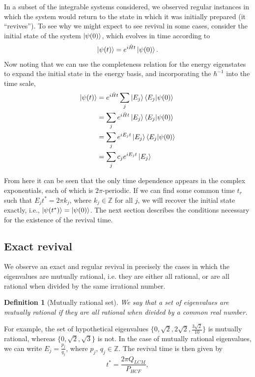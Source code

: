 \documentclass[a4paper, 10pt]{article}
\theoremstyle{plain}
\newtheorem{definition}[]{Definition}
\begin{document}
In a subset of the integrable systems considered, we observed regular instances
in which the system would return to the state in which it was initially
prepared (it ``revives''). To see why we might expect to see revival in
some cases, consider the initial state of the system $\ket{\psi(0)}$, which
evolves in time according to
\begin{equation}
 \ket{\psi(t)}=e^{i\hat{H}t}\ket{\psi(0)}.
\end{equation}
Now noting that we can use the completeness relation for the energy eigenstates
to expand the initial state in the energy basis, and incorporating the
$\hbar^{-1}$ into the time scale,
\begin{align}
\label{time_evolution}
 \ket{\psi(t)} &= e^{i\hat{H}t}\sum_j\ket{E_j}\braket{E_j|\psi(0)}  \nonumber \\
               &= \sum_je^{i\hat{H}t}\ket{E_j}\braket{E_j|\psi(0)}  \nonumber \\
               &= \sum_je^{iE_{j}t}\ket{E_j}\braket{E_j|\psi(0)}    \nonumber \\
               &= \sum_j c_{j}e^{iE_{j}t}\ket{E_j}
\end{align}

From here it can be seen that the only time dependence appears in the complex
exponentials, each of which is $2\pi$-periodic. If we can find some common
time $t_r$ such that $E_{j} t^*=2 \pi k_{j}$, where $k_{j} \in \mathbb{Z} $
for all $j$, we will recover the initial state exactly, i.e.,
$\ket{\psi(t^*)}=\ket{\psi(0)}$. The next section describes the conditions
necessary for the existence of the revival time.\\


\subsection{Exact revival}

We observe an exact and regular revival in precisely the cases in which the
eigenvalues are mutually rational, i.e. they are either all rational, or are all
rational when divided by the same irrational number.
\begin{definition}[Mutually rational set]
    We say that a set of eigenvalues are mutually rational if they are all
    rational when divided by a common real number.
\end{definition}

For example, the set of
hypothetical eigenvalues $\lbrace 0, \sqrt{2}, 2 \sqrt{2}, \frac{3 \sqrt{2}}{10}
\rbrace$ is mutually rational, whereas $\lbrace 0, \sqrt{2}, \sqrt{3}\rbrace$ is
not. In the case of mutually rational eigenvalues, we can write $E_{j} =
\frac{p_{j}}{q_{j}}$, where $p_{j}$, $q_{j} \in \mathbb{Z}$. The revival time is
then given by
\begin{equation}
\label{revival_time_formula}
 t^* = \frac{2\pi Q_{LCM}}{P_{HCF}},
\end{equation}
\end{document}
